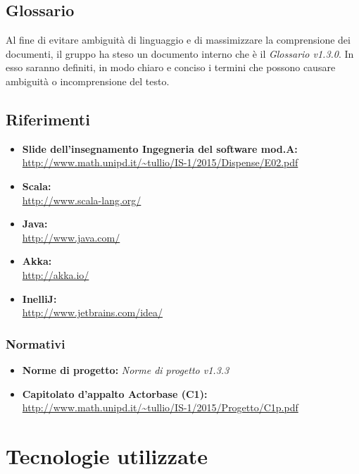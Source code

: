 \documentclass[a4paper]{article}
\begin{document}
	\subsection{Glossario}
		Al fine di evitare ambiguità di linguaggio e di massimizzare la comprensione dei documenti, il 
      gruppo ha steso un documento interno che è il \emph{Glossario v1.3.0}. In esso saranno definiti, in modo
      chiaro e conciso i termini che possono causare ambiguità o incomprensione del testo.
	\subsection{Riferimenti}
		\begin{itemize}
			\item \textbf{Slide dell'insegnamento Ingegneria del software mod.A:} \\
			\url{http://www.math.unipd.it/~tullio/IS-1/2015/Dispense/E02.pdf}
			\item \textbf{Scala:} \\
			\url{http://www.scala-lang.org/}
			\item \textbf{Java:} \\
			\url{http://www.java.com/}
			\item \textbf{Akka:} \\
			\url{http://akka.io/}
			\item \textbf{InelliJ:} \\
			\url{http://www.jetbrains.com/idea/}
		\end{itemize}
	\subsubsection{Normativi}
		\begin{itemize}
			\item \textbf{Norme di progetto:} \emph{Norme di progetto v1.3.3}
			\item \textbf{Capitolato d'appalto Actorbase (C1):} \\ 
			\url{http://www.math.unipd.it/~tullio/IS-1/2015/Progetto/C1p.pdf}
		\end{itemize}
		
		
	\newpage 
	\section{Tecnologie utilizzate}
\end{document}
